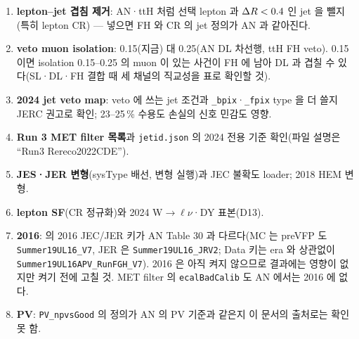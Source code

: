 \begin{openq}
\begin{enumerate}
\item \textbf{lepton–jet 겹침 제거}: AN·ttH 처럼 선택 lepton 과 $\Delta R<0.4$ 인 jet 을 뺄지(특히 lepton CR) --- 넣으면 FH 와 CR 의 jet 정의가 AN 과
  같아진다\tagours.
\item \textbf{veto muon isolation}: 0.15(지금) 대 0.25(AN DL 차선행, ttH FH veto). 0.15 이면 isolation 0.15–0.25 의 muon 이 있는 사건이 FH 에 남아
  DL 과 겹칠 수 있다(SL·DL·FH 결합 때 세 채널의 직교성을 표로 확인할 것)\tagours.
\item \textbf{2024 jet veto map}: veto 에 쓰는 jet 조건과 \texttt{\_bpix}·\texttt{\_fpix} type 을 더 쓸지 JERC 권고로 확인; 23–25\,\% 수용도 손실의
  신호 민감도 영향.
\item \textbf{Run 3 MET filter 목록}과 \texttt{jetid.json} 의 2024 전용 기준 확인(파일 설명은 ``Run3 Rereco2022CDE'').
\item \textbf{JES·JER 변형}(sysType 배선, 변형 실행)과 JEC 불확도 loader; 2018 HEM 변형\tagplan.
\item \textbf{lepton SF}(CR 정규화)와 2024 W$\to\ell\nu$·DY 표본(D13).
\item \textbf{2016}:  의 2016 JEC/JER 키가 AN Table 30 과 다르다(MC 는 preVFP 도 \texttt{Summer19UL16\_V7},
  JER 은 \texttt{Summer19UL16\_JRV2}; Data 키는 era 와 상관없이 \texttt{Summer19UL16APV\_RunFGH\_V7}).
  2016 은 아직 켜지 않으므로 결과에는 영향이 없지만 켜기 전에 고칠 것. MET filter 의 \texttt{ecalBadCalib} 도 AN 에서는 2016 에 없다.
\item \textbf{PV}: \texttt{PV\_npvsGood} 의 정의가 AN 의 PV 기준과 같은지 이 문서의 출처로는 확인 못 함.
\end{enumerate}
\end{openq}
